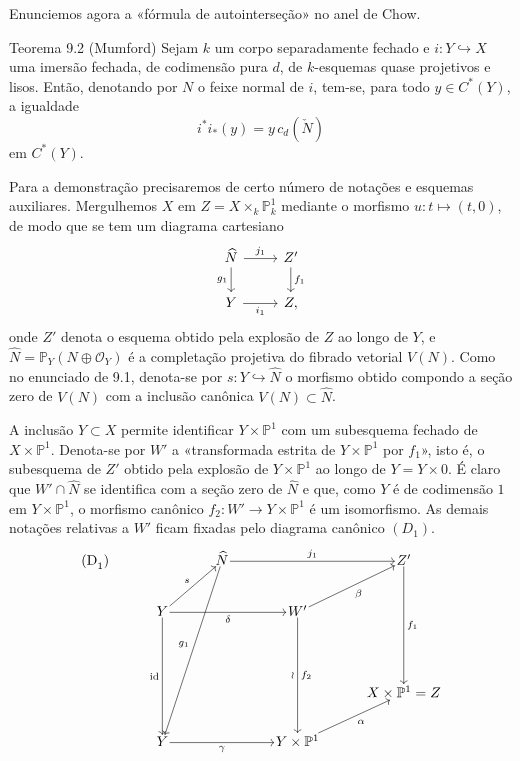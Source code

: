 Enunciemos agora a «fórmula de autointerseção» no anel de Chow.

\begin{statement}{Teorema 9.2 (Mumford)}
Sejam $k$ um corpo separadamente fechado e $i:Y\hookrightarrow X$ uma imersão fechada, de codimensão pura $d$, de $k$-esquemas quase projetivos e lisos. Então, denotando por $N$ o feixe normal de $i$, tem-se, para todo $y\in C^*(Y)$, a igualdade
\[
i^*i_*(y)=y\,c_d(\check N)
\]
em $C^*(Y)$.
\end{statement}

Para a demonstração precisaremos de certo número de notações e esquemas auxiliares. Mergulhemos $X$ em $Z=X\times_k\mathbb P^1_k$ mediante o morfismo $u:t\mapsto(t,0)$, de modo que se tem um diagrama cartesiano
\[
\begin{tikzcd}
\widehat N \arrow[r,"j_1"] \arrow[d,"g_1"'] & Z' \arrow[d,"f_1"]\\
Y \arrow[r,"i_1"'] & Z ,
\end{tikzcd}
\]
onde $Z'$ denota o esquema obtido pela explosão de $Z$ ao longo de $Y$, e $\widehat N=\mathbb P_Y(N\oplus\mathcal O_Y)$ é a completação projetiva do fibrado vetorial $V(N)$. Como no enunciado de 9.1, denota-se por $s:Y\hookrightarrow\widehat N$ o morfismo obtido compondo a seção zero de $V(N)$ com a inclusão canônica $V(N)\subset\widehat N$.

A inclusão $Y\subset X$ permite identificar $Y\times\mathbb P^1$ com um subesquema fechado de $X\times\mathbb P^1$. Denota-se por $W'$ a «transformada estrita de $Y\times\mathbb P^1$ por $f_1$», isto é, o subesquema de $Z'$ obtido pela explosão de $Y\times\mathbb P^1$ ao longo de $Y=Y\times0$. É claro que $W'\cap\widehat N$ se identifica com a seção zero de $\widehat N$ e que, como $Y$ é de codimensão $1$ em $Y\times\mathbb P^1$, o morfismo canônico $f_2:W'\to Y\times\mathbb P^1$ é um isomorfismo. As demais notações relativas a $W'$ ficam fixadas pelo diagrama canônico $(D_1)$.
\[
\begin{tikzcd}[column sep=3.2em,row sep=2.4em,cells={nodes={inner sep=1pt}}]
\text{(D}_1\text{)}\arrow[from=1-3,to=5-2,"g_1"']
& & \widehat N \arrow[rr,"j_1"] & & Z' \arrow[ddd,"f_1"] \\
& Y \arrow[ur,"s"] \arrow[rr,"\delta"'] \arrow[ddd,"\mathrm{id}"'] & &
W' \arrow[ur,"\beta"'] \arrow[ddd,"\wr"',"f_2"] & \\
& & & & \\
& & & & X\times\mathbb P^1=Z \\
& Y \arrow[rr,"\gamma"'] & & Y\times\mathbb P^1 \arrow[ur,"\alpha"'] &
\end{tikzcd}
\]


